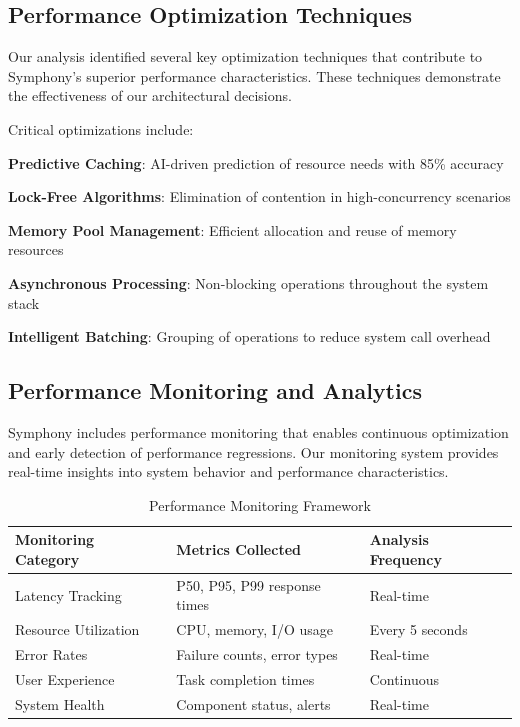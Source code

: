 \subsection*{Performance Optimization Techniques}

Our analysis identified several key optimization techniques that contribute to Symphony's superior performance characteristics. These techniques demonstrate the effectiveness of our architectural decisions.

Critical optimizations include:

\begin{expandedlist}
    \item \textbf{Predictive Caching}: AI-driven prediction of resource needs with 85\% accuracy
    \item \textbf{Lock-Free Algorithms}: Elimination of contention in high-concurrency scenarios
    \item \textbf{Memory Pool Management}: Efficient allocation and reuse of memory resources
    \item \textbf{Asynchronous Processing}: Non-blocking operations throughout the system stack
    \item \textbf{Intelligent Batching}: Grouping of operations to reduce system call overhead
\end{expandedlist}

\subsection*{Performance Monitoring and Analytics}

Symphony includes performance monitoring that enables continuous optimization and early detection of performance regressions. Our monitoring system provides real-time insights into system behavior and performance characteristics.

\begin{table}[ht]
\centering
\begin{tabular}{@{}lll@{}}
\toprule
\textbf{Monitoring Category} & \textbf{Metrics Collected} & \textbf{Analysis Frequency} \\
\midrule
Latency Tracking & P50, P95, P99 response times & Real-time \\
Resource Utilization & CPU, memory, I/O usage & Every 5 seconds \\
Error Rates & Failure counts, error types & Real-time \\
User Experience & Task completion times & Continuous \\
System Health & Component status, alerts & Real-time \\
\bottomrule
\end{tabular}
\caption{Performance Monitoring Framework}
\end{table}

